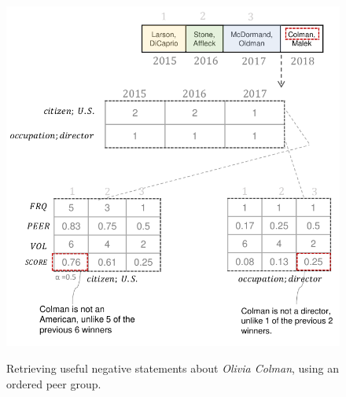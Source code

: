 \begin{figure}
 \caption{Retrieving useful negative statements about \textit{Olivia Colman}, using an ordered peer group.}
\includegraphics[width=\linewidth]{figures/diagram}
\label{fig:diagram}
\end{figure}


